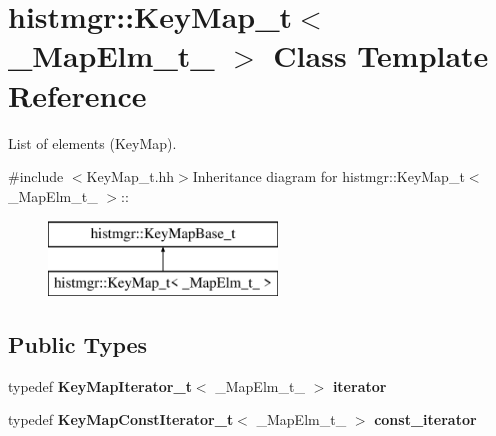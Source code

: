 \section{histmgr::KeyMap\_\-t$<$ \_\-MapElm\_\-t\_\- $>$ Class Template Reference}
\label{classhistmgr_1_1KeyMap__t}


List of elements (KeyMap).  


{\ttfamily \#include $<$KeyMap\_\-t.hh$>$}Inheritance diagram for histmgr::KeyMap\_\-t$<$ \_\-MapElm\_\-t\_\- $>$::\begin{figure}[H]
\begin{center}
\leavevmode
\includegraphics[height=2cm]{classhistmgr_1_1KeyMap__t}
\end{center}
\end{figure}
\subsection*{Public Types}
\begin{DoxyCompactItemize}
\item 
typedef {\bf KeyMapIterator\_\-t}$<$ \_\-MapElm\_\-t\_\- $>$ {\bfseries iterator}\label{classhistmgr_1_1KeyMap__t_a8a2d57bf4a4aa46158fdd4507348423f}

\item 
typedef {\bf KeyMapConstIterator\_\-t}$<$ \_\-MapElm\_\-t\_\- $>$ {\bfseries const\_\-iterator}\label{classhistmgr_1_1KeyMap__t_ad7d7fae50c54bcd113540b47031e1d2f}

\end{DoxyCompactItemize}
